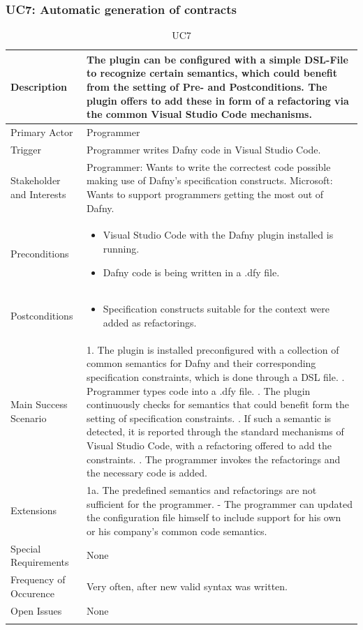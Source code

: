 \subsubsection{UC7: Automatic generation of contracts}
\begin{longtable}{l | p{} }
	Description & The plugin can be configured with a simple DSL-File to recognize certain semantics, which could benefit from the setting of Pre- and Postconditions. The plugin offers to add these in form of a refactoring via the common Visual Studio Code mechanisms.\\ \hline
	Primary Actor & Programmer\\ \hline
	Trigger & Programmer writes Dafny code in Visual Studio Code.\\ \hline
	Stakeholder and Interests & Programmer: Wants to write the correctest code possible making use of Dafny's specification constructs. \newline Microsoft: Wants to support programmers getting the most out of Dafny.\\ \hline
	Preconditions &
	\begin{itemize}
		\item Visual Studio Code with the Dafny plugin installed is running.
		\item Dafny code is being written in a .dfy file.
	\end{itemize}\\ \hline
	Postconditions &
	\begin{itemize}
		\item Specification constructs suitable for the context were added as refactorings.
	\end{itemize}\\ \hline
	Main Success Scenario & 
	1. The plugin is installed preconfigured with a collection of common semantics for Dafny and their corresponding specification constraints, which is done through a DSL file. \newline
	2. Programmer types code into a .dfy file. \newline 
	3. The plugin continuously checks for semantics that could benefit form the setting of specification constraints. \newline 
	4. If such a semantic is detected, it is reported through the standard mechanisms of Visual Studio Code, with a refactoring offered to add the constraints. \newline
	5. The programmer invokes the refactorings and the necessary code is added.\\ \hline
	Extensions & 
	1a. The predefined semantics and refactorings are not sufficient for the programmer. \newline 
	- The programmer can updated the configuration file himself to include support for his own or his company's  common code semantics. \\ \hline
	Special Requirements & None\\ \hline
	Frequency of Occurence & Very often, after new valid syntax was written.\\ \hline
	Open Issues & None \\ \hline
	\caption{UC7}
\end{longtable}

